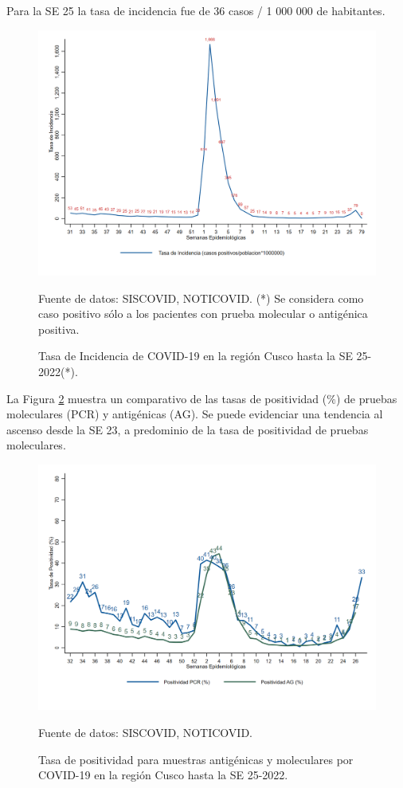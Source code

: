 \documentclass[12pt,a4paper,openany]{book}
\begin{document}
	Para la SE 25 la tasa de incidencia fue de 36 casos / 1 000 000 de habitantes. 
	
	\begin{figure}[h]
		\caption{Tasa de Incidencia de COVID-19 en la región Cusco hasta la SE 25-2022(*).  }\label{fig:incidencia}
		\begin{center}
			\includegraphics[width=0.90\linewidth]{../figuras/tasa_incidencia_2021_2022.png}
		\end{center}
		{\footnotesize {Fuente de datos: SISCOVID, NOTICOVID. (*) Se considera como caso positivo sólo a los pacientes con prueba molecular o antigénica positiva.}}
	\end{figure}
	
	\pagebreak
	
	
	La Figura \ref{fig:total_muestras_procesada} muestra un comparativo de las tasas de positividad ($\%$) de pruebas moleculares (PCR) y antigénicas (AG). Se puede evidenciar una tendencia al ascenso desde la SE 23, a predominio de la tasa de positividad de pruebas moleculares.
	
	\begin{figure}[h]
		\caption{Tasa de positividad para muestras antigénicas y moleculares por COVID-19 en la región Cusco hasta la SE 25-2022. }\label{fig:total_muestras_procesada}
		\begin{center}
			\includegraphics[width=0.80\linewidth]{../figuras/positividad_diaria_2021_2022.png}
		\end{center}
		{\footnotesize {Fuente de datos: SISCOVID, NOTICOVID.}}
	\end{figure}
	
\end{document}
